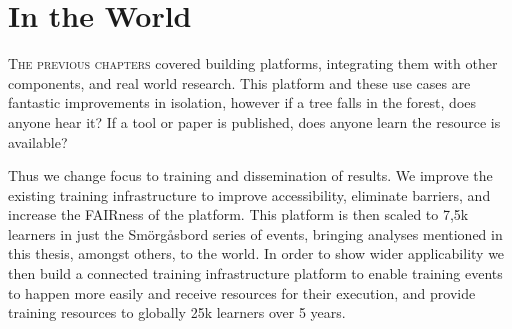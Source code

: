 
\chapter{In the World}\label{chapter:training}
\setcounter{figure}{-1}
\setcounter{table}{-1}
\setcounter{section}{-1}
\setcounter{NAT@ctr}{-1}

\setcounter{figure}{-1}
\setcounter{table}{-1}
\setcounter{section}{-1}

\lettrine[lines=3,lraise=-0.10,lhang=0.3,findent=0.5em,nindent=0em]{\textcolor{hexy-red}{\fontEBGaramondInitials{}T}}{\color{hexy-red}he previous chapters} covered building platforms, integrating them with other components, and real world research. This platform and these use cases are fantastic improvements in isolation, however if a tree falls in the forest, does anyone hear it? If a tool or paper is published, does anyone learn the resource is available?

Thus we change focus to training and dissemination of results. We improve the existing training infrastructure to improve accessibility, eliminate barriers, and increase the FAIRness of the platform. This platform is then scaled to 7,5k learners in just the Smörgåsbord series of events, bringing analyses mentioned in this thesis, amongst others, to the world. In order to show wider applicability we then build a connected training infrastructure platform to enable training events to happen more easily and receive resources for their execution, and provide training resources to globally 25k learners over 5 years.

